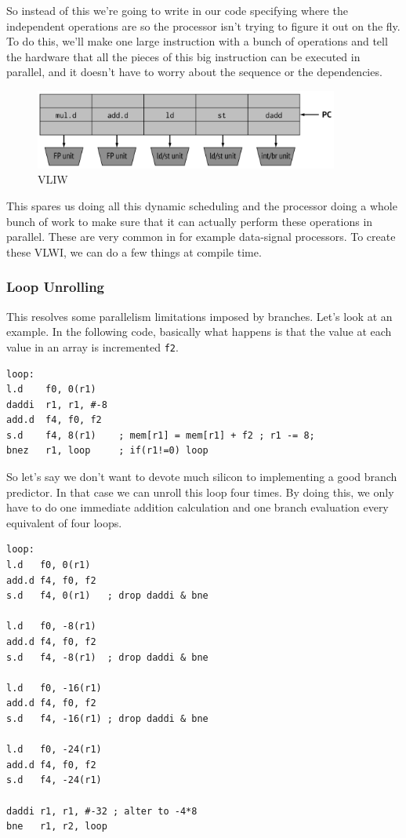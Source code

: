 \documentclass{article}
\begin{document}
So instead of this we're going to write in our code specifying where the independent operations are so the processor isn't trying to figure it out on the fly. To do this, we'll make one large instruction with a bunch of operations and tell the hardware that all the pieces of this big instruction can be executed in parallel, and it doesn't have to worry about the sequence or the dependencies. 

 \begin{figure}[ht!]
\centering
\includegraphics[width=100mm]{img/vliw.png}
\caption{VLIW}
\end{figure}

This spares us doing all this dynamic scheduling and the processor doing a whole bunch of work to make sure that it can actually perform these operations in parallel. These are very common in for example data-signal processors. To create these VLWI, we can do a few things at compile time. 

\subsubsection{Loop Unrolling}

This resolves some parallelism limitations imposed by branches. Let's look at an example. In the following code, basically what happens is that the value at each value in an array is incremented \texttt{f2}. 

\scriptsize
\begin{verbatim}
loop:
l.d    f0, 0(r1)    
daddi  r1, r1, #-8  
add.d  f4, f0, f2    
s.d    f4, 8(r1)    ; mem[r1] = mem[r1] + f2 ; r1 -= 8;
bnez   r1, loop     ; if(r1!=0) loop
\end{verbatim}
\normalsize

So let's say we don't want to devote much silicon to implementing a good branch predictor. In that case we can unroll this loop four times. By doing this, we only have to do one immediate addition calculation and one branch evaluation every equivalent of four loops. 


\scriptsize
\begin{verbatim}
loop:
l.d   f0, 0(r1)
add.d f4, f0, f2
s.d   f4, 0(r1)   ; drop daddi & bne

l.d   f0, -8(r1)
add.d f4, f0, f2
s.d   f4, -8(r1)  ; drop daddi & bne

l.d   f0, -16(r1)
add.d f4, f0, f2
s.d   f4, -16(r1) ; drop daddi & bne

l.d   f0, -24(r1)
add.d f4, f0, f2
s.d   f4, -24(r1)

daddi r1, r1, #-32 ; alter to -4*8
bne   r1, r2, loop
\end{verbatim}
\end{document}
